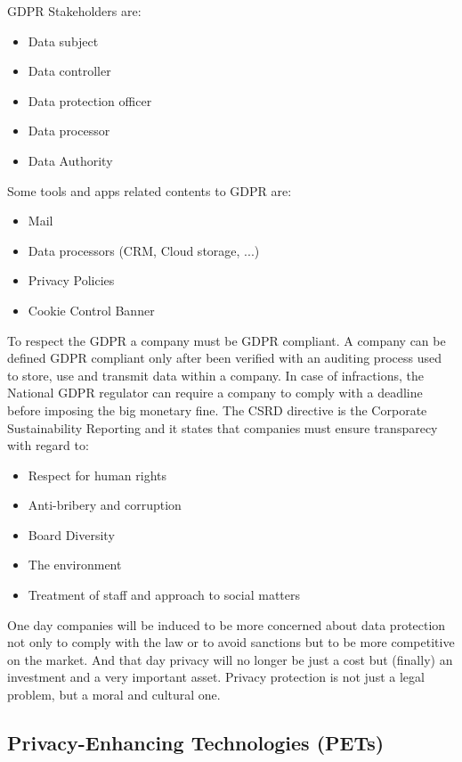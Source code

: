 GDPR Stakeholders are: 

\begin{itemize}
    \item Data subject
    \item Data controller 
    \item Data protection officer 
    \item Data processor 
    \item Data Authority
\end{itemize}

Some tools and apps related contents to GDPR are:

\begin{itemize}
    \item Mail
    \item Data processors (CRM, Cloud storage, ...)
    \item Privacy Policies 
    \item Cookie Control Banner 
\end{itemize}

 To respect the GDPR a company must be GDPR compliant. A company can be defined GDPR compliant only after been verified with an auditing process used to store, use and transmit data within a company. In case of infractions, the National GDPR regulator can require a company to comply with a deadline before imposing the big monetary fine.\newline
 The CSRD directive is the Corporate Sustainability Reporting and it states that companies must ensure transparecy with regard to: 
 \begin{itemize}
     \item Respect for human rights 
     \item Anti-bribery and corruption 
     \item Board Diversity 
     \item The environment
     \item Treatment of staff and approach to social matters
 \end{itemize}

 One day companies will be induced to be more concerned about data protection not only to comply with the law or to avoid sanctions but to be more competitive on the market. And that day privacy will no longer be just a cost but (finally) an investment and a very important asset. Privacy protection is not just a legal problem, but a moral and cultural one.

 \subsection{Privacy-Enhancing Technologies (PETs)}

